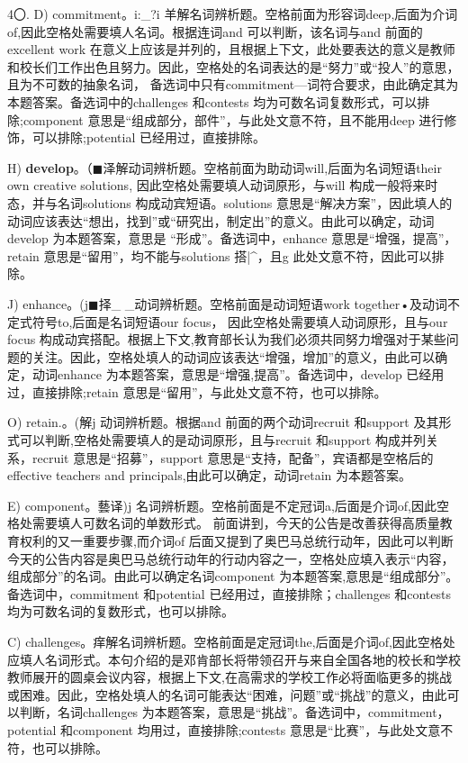 \documentclass[UTF8,11pt]{ctexart}
\begin{document}
4〇. D) commitment。i:\_?i 羊解名词辨析题。空格前面为形容词deep,后面为介词of,因此空格处需要填人名词。根据连词and 可以判断，该名词与and 前面的excellent work 在意义上应该是并列的，且根据上下文，此处要表达的意义是教师和校长们工作出色且努力。因此，空格处的名词表达的是“努力”或“投人”的意思，且为不可数的抽象名词， 备选词中只有commitment—词符合要求，由此确定其为本题答案。备选词中的challenges 和contests 均为可数名词复数形式，可以排除;component 意思是“组成部分，部件”，与此处文意不符，且不能用deep 进行修饰，可以排除;potential 已经用过，直接排除。


H) \textbf{develop}。（\(\blacksquare\)泽解动词辨析题。空格前面为助动词will,后面为名词短语their own creative solutions, 因此空格处需要填人动词原形，与will 构成一般将来时态，并与名词solutions 构成动宾短语。solutions 意思是“解决方案”，因此填人的动词应该表达“想出，找到”或“研究出，制定出”的意义。由此可以确定，动词develop 为本题答案，意思是 “形成”。备选词中，enhance 意思是“增强，提高”，retain 意思是“留用”，均不能与solutions 搭|\textasciicircum{}，且g 此处文意不符，因此可以排除。


J) enhance。(j\(\blacksquare\)择\_ \_动词辨析题。空格前面是动词短语work together•及动词不定式符号to,后面是名词短语our focus， 因此空格处需要填人动词原形，且与our focus 构成动宾搭配。根据上下文,教育部长认为我们必须共同努力增强对于某些问题的关注。因此，空格处填人的动词应该表达“增强，增加”的意义，由此可以确定，动词enhance 为本题答案，意思是“增强,提高”。备选词中，develop 已经用过，直接排除;retain 意思是“留用”，与此处文意不符，也可以排除。


O) retain.。(解j 动词辨析题。根据and 前面的两个动词recruit 和support 及其形式可以判断,空格处需要填人的是动词原形，且与recruit 和support 构成并列关系，recruit 意思是“招募”，support 意思是“支持，配备”，宾语都是空格后的effective teachers and principals,由此可以确定，动词retain 为本题答案。


E) component。藝译)j 名词辨析题。空格前面是不定冠词a,后面是介词of,因此空格处需要填人可数名词的单数形式。 前面讲到，今天的公告是改善获得高质量教育权利的又一重要步骤,而介词of 后面又提到了奥巴马总统行动年，因此可以判断今天的公告内容是奥巴马总统行动年的行动内容之一，空格处应填入表示“内容，组成部分”的名词。由此可以确定名词component 为本题答案,意思是“组成部分”。备选词中，commitment 和potential 已经用过，直接排除；challenges 和contests 均为可数名词的复数形式，也可以排除。


C) challenges。痒解名词辨析题。空格前面是定冠词the,后面是介词of,因此空格处应填人名词形式。本句介绍的是邓肯部长将带领召开与来自全国各地的校长和学校教师展开的圆桌会议内容，根据上下文,在高需求的学校工作必将面临更多的挑战或困难。因此，空格处填人的名词可能表达“困难，问题”或“挑战”的意义，由此可以判断，名词challenges 为本题答案，意思是“挑战”。备选词中，commitment，potential 和component 均用过，直接排除;contests 意思是“比赛”，与此处文意不符，也可以排除。
\end{document}
